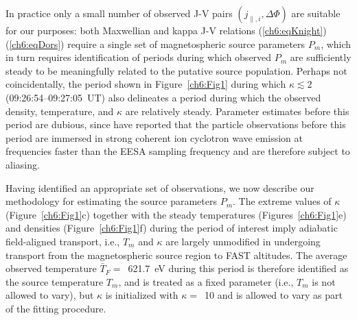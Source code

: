   In practice only a small number of observed J-V pairs $( j_{\parallel,i} ,
  \Delta \Phi )$ are suitable for our purposes: both Maxwellian and kappa J-V
  relations (\ref{ch6:eqKnight}) (\ref{ch6:eqDors}) require a single set of
  magnetospheric source parameters $P_m$, which in turn requires identification
  of periods during which observed $P_m$ are sufficiently steady to be
  meaningfully related to the putative source population. Perhaps not
  coincidentally, the period shown in Figure~\ref{ch6:Fig1} during which $\kappa
  \lesssim 2$ (09:26:54--09:27:05~UT) also delineates a period during which the
  observed density, temperature, and $\kappa$ are relatively steady. Parameter
  estimates before this period are dubious, since \citet{Chaston2002b} have
  reported that the particle observations before this period are immersed in
  strong coherent ion cyclotron wave emission at frequencies faster than the
  EESA sampling frequency and are therefore subject to aliasing.

  Having identified an appropriate set of observations, we now describe our
  methodology for estimating the source parameters $P_m$. The extreme values of
  $\kappa$ (Figure~\ref{ch6:Fig1}c) together with the steady temperatures
  (Figures~\ref{ch6:Fig1}e) and densities (Figure~\ref{ch6:Fig1}f) during the
  period of interest imply adiabatic field-aligned transport, i.e., $T_m$ and
  $\kappa$ are largely unmodified in undergoing transport from the
  magnetospheric source region to FAST altitudes. The average observed
  temperature $\bar{T}_F =$~621.7~eV during this period is therefore identified
  as the source temperature $T_m$, and is treated as a fixed parameter (i.e.,
  $T_m$ is not allowed to vary), but $\kappa$ is initialized with $\kappa =$~10
  and is allowed to vary as part of the fitting procedure.
  
